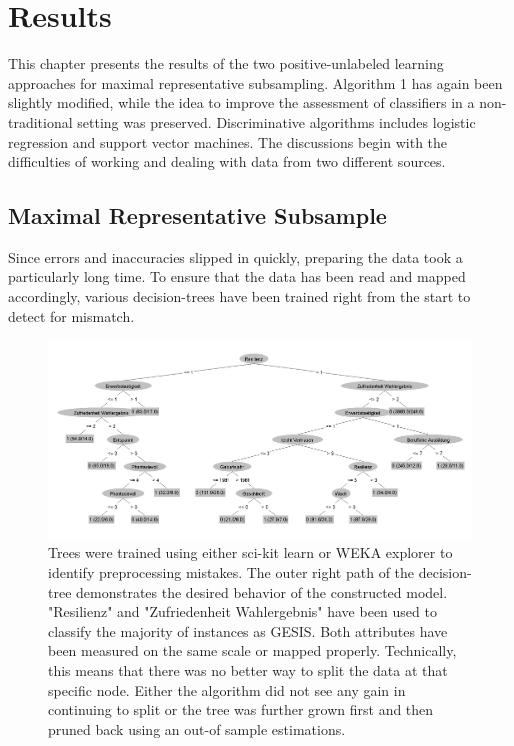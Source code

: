 \chapter{Results}\label{Sec:Results}

This chapter presents the results of the two positive-unlabeled learning approaches for maximal representative subsampling. Algorithm 1 has again been slightly modified, while the idea to improve the assessment of classifiers in a non-traditional setting was preserved. Discriminative algorithms includes logistic regression and support vector machines. The discussions begin with the difficulties of working and dealing with data from two different sources.

\section{Maximal Representative Subsample}

Since errors and inaccuracies slipped in quickly, preparing the data took a particularly long time. To ensure that the data has been read and mapped accordingly, various decision-trees have been trained right from the start to detect for mismatch. 

\begin{figure}[ht]
\centering
   \includegraphics[scale=0.28,angle=0]{fig/j48}
\captionsetup{width= 400pt}
\caption{Trees were trained using either sci-kit learn or WEKA explorer to identify preprocessing mistakes. The outer right path of the decision-tree demonstrates the desired behavior of the constructed model. "Resilienz"  and "Zufriedenheit Wahlergebnis" have been used to classify the majority of instances as GESIS. Both attributes have been measured on the same scale or mapped properly. Technically, this means that there was no better way to split the data at that specific node. Either the algorithm did not see any gain in continuing to split or the tree was further grown first and then pruned back using an out-of sample estimations.}
\end{figure}

